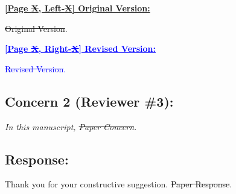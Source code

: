 \begin{tcolorbox}[colframe=black,colback=white,arc=0mm,boxrule=0.5mm, left=1mm, right=1mm, top=1mm, bottom=1mm, use color stack,breakable]

  \noindent \textbf{\underline{[Page \sout{X}, Left-\sout{X}] Original Version:}}

  \vspace{1mm}

  \noindent
  \sout{Original Version}.

  \hrulefill
  \vspace{1mm}

  \noindent \textbf{\textcolor{blue}{\underline{[Page \sout{X}, Right-\sout{X}] Revised Version:}}}

  \vspace{1mm}

  \noindent
  \textcolor{blue}{
    \sout{Revised Version}.
  }

\end{tcolorbox}

{}
\subsection*{Concern 2 (Reviewer \#3):}
\textit{In this manuscript, \sout{Paper Concern}.}

\subsection*{Response:}
Thank you for your constructive suggestion.
\sout{Paper Response}.

